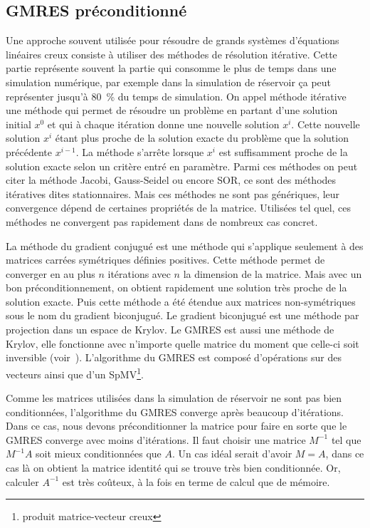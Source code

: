 \subsection{GMRES préconditionné}
Une approche souvent utilisée pour résoudre de grands systèmes d'équations linéaires creux consiste à utiliser des méthodes de résolution itérative.
%
Cette partie représente souvent la partie qui consomme le plus de temps dans une simulation numérique, par exemple dans la simulation de réservoir ça peut représenter jusqu'à 80~\% du temps de simulation.
%
On appel méthode itérative une méthode qui permet de résoudre un problème en partant d'une solution initial $x^0$ et qui à chaque itération donne une nouvelle solution $x^i$.
%
Cette nouvelle solution $x^i$ étant plus proche de la solution exacte du problème que la solution précédente $x^{i-1}$.
%
La méthode s'arrête lorsque $x^i$ est suffisamment proche de la solution exacte selon un critère entré en paramètre.
%
Parmi ces méthodes on peut citer la méthode Jacobi, Gauss-Seidel ou encore SOR, ce sont des méthodes itératives dites stationnaires.
%
Mais ces méthodes ne sont pas génériques, leur convergence dépend de certaines propriétés de la matrice.
%
Utilisées tel quel, ces méthodes ne convergent pas rapidement dans de nombreux cas concret.


La méthode du gradient conjugué est une méthode qui s'applique seulement à des matrices carrées symétriques définies positives.
%
Cette méthode permet de converger en au plus $n$ itérations avec $n$ la dimension de la matrice.
%
Mais avec un bon préconditionnement, on obtient rapidement une solution très proche de la solution exacte.
%
Puis cette méthode a été étendue aux matrices non-symétriques sous le nom du gradient biconjugué.
%
Le gradient biconjugué est une méthode par projection dans un espace de Krylov.
%
Le GMRES est aussi une méthode de Krylov, elle fonctionne avec n'importe quelle matrice du moment que celle-ci soit inversible (voir~\cite{Saad96IMSLS}).
%
L'algorithme du GMRES est composé d'opérations sur des vecteurs ainsi que d'un SpMV\footnote{produit matrice-vecteur creux}.

Comme les matrices utilisées dans la simulation de réservoir ne sont pas bien conditionnées, l'algorithme du GMRES converge après beaucoup d'itérations.
%
Dans ce cas, nous devons préconditionner la matrice pour faire en sorte que le GMRES converge avec moins d'itérations.
%
Il faut choisir une matrice $M^{-1}$ tel que $M^{-1}A$ soit mieux conditionnées que $A$.
%
Un cas idéal serait d'avoir $M=A$, dans ce cas là on obtient la matrice identité qui se trouve très bien conditionnée.
%
Or, calculer $A^{-1}$ est très coûteux, à la fois en terme de calcul que de mémoire.

